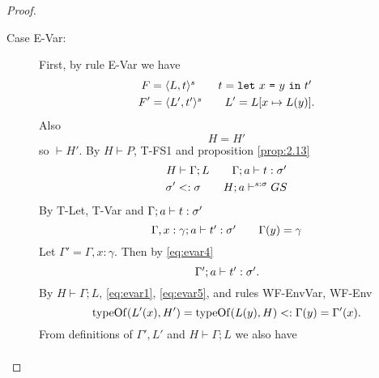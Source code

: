 \begin{proof}
\begin{description}
\begin{description}
\begin{description}
            \item[Case {\sc E-Var}:] First, by rule {\sc E-Var} we have
              \begin{equation} 
                \begin{gathered}
                  F = \mbox{$\langle L, t \rangle^s$} \quad\quad t = \mbox{\mdseries\texttt{let}~$x$~\texttt{=}~$y$~\texttt{in}~$t'$} \\ 
                  F' = \mbox{$\langle L', t' \rangle^s$} \quad\quad L' = L[x \mapsto L(y)].
                \end{gathered}
              \end{equation}
              Also
              \begin{equation} \label{eq:evar1}
                H = H'
              \end{equation}
              so $\vdash H'$.
              By $H \vdash P$, {\sc T-FS1} and proposition \ref{prop:2.13}
              \begin{equation} \label{eq:evar3}
                \begin{gathered}
                  H \vdash \Gamma; L \quad\quad \mbox{$\Gamma;a\vdash t:\sigma'$} \\
                  \sigma' <: \sigma \quad\quad H; a \vdash^{s: \sigma} GS
                \end{gathered}
              \end{equation}
              By {\sc T-Let, T-Var} and $\mbox{$\Gamma;a\vdash t:\sigma'$}$
              \begin{equation} \label{eq:evar4}
                \mbox{$\Gamma, x: \gamma;a\vdash t':\sigma'$} \quad\quad \Gamma(y) =
                \gamma
              \end{equation}
              Let $\Gamma' = \Gamma, x: \gamma$.
              Then by \eqref{eq:evar4}
              \begin{equation} \label{eq:evar5}
                \mbox{$\Gamma';a\vdash t':\sigma'$}.
              \end{equation}
              By $H \vdash \Gamma; L$, \eqref{eq:evar1}, \eqref{eq:evar5}, and
              rules {\sc WF-EnvVar}, {\sc WF-Env}
              \begin{equation} \label{eq:evar8}
                \mbox{$\mathrm{typeOf}$}(L'(x), H') = \mbox{$\mathrm{typeOf}$}(L(y), H) <: \Gamma(y) =
                \Gamma'(x).
              \end{equation}
              From definitions of $\Gamma', L'$ and $H \vdash \Gamma;L$ we also have 
              \begin{equation} \label{eq:evar9}
                \begin{aligned}

\end{aligned}
\end{equation}
\end{description}
\end{description}
\end{description}
\end{proof}
